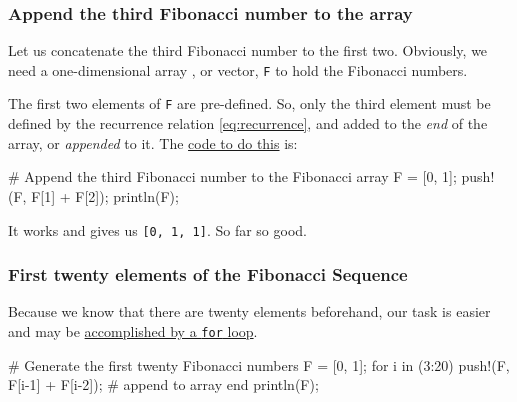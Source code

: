 \documentclass[
  a4paper,
]{article}
\newenvironment{Shaded}{\begin{snugshade}}{\end{snugshade}}
\newcommand{\CommentTok}[1]{\textcolor[rgb]{0.50,0.62,0.50}{#1}}
\newcommand{\ControlFlowTok}[1]{\textcolor[rgb]{0.94,0.87,0.69}{#1}}
\newcommand{\FloatTok}[1]{\textcolor[rgb]{0.75,0.75,0.82}{#1}}
\newcommand{\FunctionTok}[1]{\textcolor[rgb]{0.94,0.94,0.56}{#1}}
\newcommand{\KeywordTok}[1]{\textcolor[rgb]{0.94,0.87,0.69}{#1}}
\newcommand{\NormalTok}[1]{\textcolor[rgb]{0.80,0.80,0.80}{#1}}
\newcommand{\OperatorTok}[1]{\textcolor[rgb]{0.94,0.94,0.82}{#1}}
\begin{document}
\hypertarget{append-the-third-fibonacci-number-to-the-array}{%
\subsubsection{Append the third Fibonacci number to the
array}\label{append-the-third-fibonacci-number-to-the-array}}

Let us concatenate the third Fibonacci number to the first two.
Obviously, we need a one-dimensional array , or vector, \texttt{F} to
hold the Fibonacci numbers.

The first two elements of \texttt{F} are pre-defined. So, only the third
element must be defined by the recurrence relation \cref{eq:recurrence},
and added to the \emph{end} of the array, or \emph{appended} to it. The
\href{first-three.jl}{code to do this} is:

\begin{Shaded}
\begin{Highlighting}[]
\CommentTok{\# Append the third Fibonacci number to the Fibonacci array}
\NormalTok{F }\OperatorTok{=}\NormalTok{ [}\FloatTok{0}\NormalTok{, }\FloatTok{1}\NormalTok{];}
\FunctionTok{push!}\NormalTok{(F, F[}\FloatTok{1}\NormalTok{] }\OperatorTok{+}\NormalTok{ F[}\FloatTok{2}\NormalTok{]);}
\FunctionTok{println}\NormalTok{(F);}
\end{Highlighting}
\end{Shaded}

It works and gives us \texttt{{[}0,\ 1,\ 1{]}}. So far so good.

\hypertarget{first-twenty-elements-of-the-fibonacci-sequence}{%
\subsubsection{First twenty elements of the Fibonacci
Sequence}\label{first-twenty-elements-of-the-fibonacci-sequence}}

Because we know that there are twenty elements beforehand, our task is
easier and may be \href{auxiliary/first-twenty.jl}{accomplished by a
\texttt{for} loop}.

\begin{Shaded}
\begin{Highlighting}[]
\CommentTok{\# Generate the first twenty Fibonacci numbers}
\NormalTok{F }\OperatorTok{=}\NormalTok{ [}\FloatTok{0}\NormalTok{, }\FloatTok{1}\NormalTok{];}
\ControlFlowTok{for}\NormalTok{ i }\KeywordTok{in}\NormalTok{ (}\FloatTok{3}\OperatorTok{:}\FloatTok{20}\NormalTok{)}
  \FunctionTok{push!}\NormalTok{(F, F[i}\OperatorTok{{-}}\FloatTok{1}\NormalTok{] }\OperatorTok{+}\NormalTok{ F[i}\OperatorTok{{-}}\FloatTok{2}\NormalTok{]); }\CommentTok{\# append to array}
\ControlFlowTok{end}
\FunctionTok{println}\NormalTok{(F);}
\end{Highlighting}
\end{Shaded}
\end{document}
